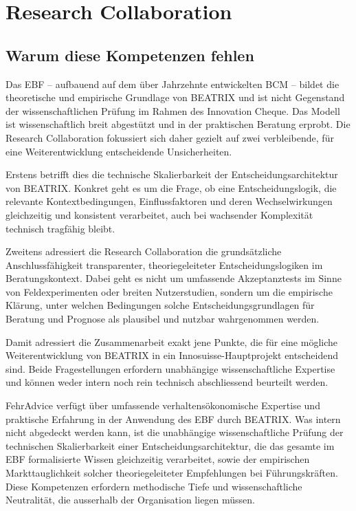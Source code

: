 \documentclass[11pt,a4paper]{article}
\begin{document}
\section{Research Collaboration}

\subsection{Warum diese Kompetenzen fehlen}

Das EBF -- aufbauend auf dem über Jahrzehnte entwickelten BCM -- bildet die theoretische und empirische Grundlage von BEATRIX und ist nicht Gegenstand der wissenschaftlichen Prüfung im Rahmen des Innovation Cheque. Das Modell ist wissenschaftlich breit abgestützt und in der praktischen Beratung erprobt. Die Research Collaboration fokussiert sich daher gezielt auf zwei verbleibende, für eine Weiterentwicklung entscheidende Unsicherheiten.

Erstens betrifft dies die technische Skalierbarkeit der Entscheidungsarchitektur von BEATRIX. Konkret geht es um die Frage, ob eine Entscheidungslogik, die relevante Kontextbedingungen, Einflussfaktoren und deren Wechselwirkungen gleichzeitig und konsistent verarbeitet, auch bei wachsender Komplexität technisch tragfähig bleibt.

Zweitens adressiert die Research Collaboration die grundsätzliche Anschlussfähigkeit transparenter, theoriegeleiteter Entscheidungslogiken im Beratungskontext. Dabei geht es nicht um umfassende Akzeptanztests im Sinne von Feldexperimenten oder breiten Nutzerstudien, sondern um die empirische Klärung, unter welchen Bedingungen solche Entscheidungsgrundlagen für Beratung und Prognose als plausibel und nutzbar wahrgenommen werden.

Damit adressiert die Zusammenarbeit exakt jene Punkte, die für eine mögliche Weiterentwicklung von BEATRIX in ein Innosuisse-Hauptprojekt entscheidend sind. Beide Fragestellungen erfordern unabhängige wissenschaftliche Expertise und können weder intern noch rein technisch abschliessend beurteilt werden.

FehrAdvice verfügt über umfassende verhaltensökonomische Expertise und praktische Erfahrung in der Anwendung des EBF durch BEATRIX. Was intern nicht abgedeckt werden kann, ist die unabhängige wissenschaftliche Prüfung der technischen Skalierbarkeit einer Entscheidungsarchitektur, die das gesamte im EBF formalisierte Wissen gleichzeitig verarbeitet, sowie der empirischen Markttauglichkeit solcher theoriegeleiteter Empfehlungen bei Führungskräften. Diese Kompetenzen erfordern methodische Tiefe und wissenschaftliche Neutralität, die ausserhalb der Organisation liegen müssen.
\end{document}
